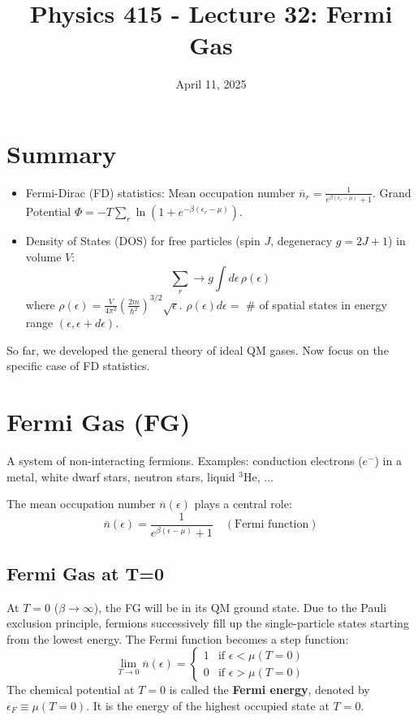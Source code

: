 \documentclass[11pt]{article}
\title{Physics 415 - Lecture 32: Fermi Gas}
\date{April 11, 2025}
\author{} %
\newcommand{\eps}{\epsilon}
\newcommand{\nbar}{\overline{n}} %
\newcommand{\ef}{\epsilon_F} %
\begin{document}
\maketitle
\thispagestyle{empty}

\section*{Summary}

\begin{itemize}
    \item Fermi-Dirac (FD) statistics: Mean occupation number $\nbar_r = \frac{1}{e^{\beta(\eps_r-\mu)} + 1}$. Grand Potential $\Phi = -T \sum_r \ln(1 + e^{-\beta(\eps_r-\mu)})$.
    \item Density of States (DOS) for free particles (spin $J$, degeneracy $g=2J+1$) in volume $V$:
    \[ \sum_r \to g \int d\eps \, \rho(\eps) \]
    where $\rho(\eps) = \frac{V}{4\pi^2} \left( \frac{2m}{\hbar^2} \right)^{3/2} \sqrt{\eps}$. $\rho(\eps)d\eps =$ \# of spatial states in energy range $(\eps, \eps+d\eps)$.
\end{itemize}
So far, we developed the general theory of ideal QM gases. Now focus on the specific case of FD statistics.

\section*{Fermi Gas (FG)}

A system of non-interacting fermions.
Examples: conduction electrons ($e^-$) in a metal, white dwarf stars, neutron stars, liquid $^3$He, ...

The mean occupation number $\nbar(\eps)$ plays a central role:
\[ \nbar(\eps) = \frac{1}{e^{\beta(\eps-\mu)} + 1} \quad (\text{Fermi function}) \]

\subsection*{Fermi Gas at T=0}

At $T=0$ ($\beta \to \infty$), the FG will be in its QM ground state. Due to the Pauli exclusion principle, fermions successively fill up the single-particle states starting from the lowest energy.
The Fermi function becomes a step function:
\[ \lim_{T \to 0} \nbar(\eps) = \begin{cases} 1 & \text{if } \eps < \mu(T=0) \\ 0 & \text{if } \eps > \mu(T=0) \end{cases} \]
The chemical potential at $T=0$ is called the \textbf{Fermi energy}, denoted by $\ef \equiv \mu(T=0)$. It is the energy of the highest occupied state at $T=0$.
\end{document}
